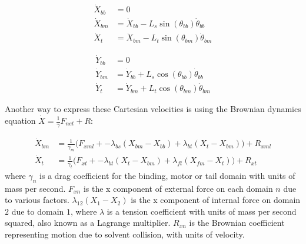 \documentclass[
11pt, %
english, %
singlespacing, %
headsepline, %
chapterinoneline, %
]{MastersDoctoralThesis} %
\begin{document}
\noindent\begin{minipage}{0.49\linewidth}
\begin{align}
  \dot{X}_{bb} &= 0 \\
  \dot{X}_{bm} &= \dot{X}_{bb} - L_{s}\sin(\theta_{bb})\dot{\theta}_{bb} \label{cartesian-bmx}\\
  \dot{X}_{t } &= \dot{X}_{bm} - L_{t}\sin(\theta_{bm})\dot{\theta}_{bm}
\end{align}
\end{minipage}
\begin{minipage}{0.49\linewidth}
\begin{align}                                                                          
  \dot{Y}_{bb} &= 0 \\                                                        
  \dot{Y}_{bm} &= \dot{Y}_{bb} + L_{s}\cos(\theta_{bb})\dot{\theta}_{bb} \\
  \dot{Y}_{t}  &= \dot{Y}_{bm} + L_{t}\cos(\theta_{bm})\dot{\theta}_{bm}
\end{align}
\end{minipage}
\vspace{.5cm}

Another way to express these Cartesian velocities is using the Brownian dynamics equation $\dot{X} = \frac1\gamma F_{net} + R$:

\begin{align}  
  \dot{X}_{bm} &= \frac{1}{\gamma_m} \Big(F_{xml} + - \lambda_{bs}(X_{bm} - X_{bb}) + \lambda_{bt}(X_{t } - X_{bm}) \Big) + R_{xml} \label{brownian-bmx}\\
  \dot{X}_{t } &= \frac{1}{\gamma_t} \Big(F_{xt } + - \lambda_{bt}(X_{t } - X_{bm}) + \lambda_{ft}(X_{fm} - X_{t }) \Big) + R_{xt }
\end{align}
%
where $\gamma_n$ is a drag coefficient for the binding, motor or tail domain with units of mass per second. $F_{xn}$ is the x component of external force on each domain $n$ due to various factors. $\lambda_{12}\left(X_1 - X_2\right)$ is the x component of internal force on domain $2$ due to domain $1$, where $\lambda$ is a tension coefficient with units of mass per second squared, also known as a Lagrange multiplier. $R_{xn}$ is the Brownian coefficient representing motion due to solvent collision, with units of velocity.\\
\end{document}

